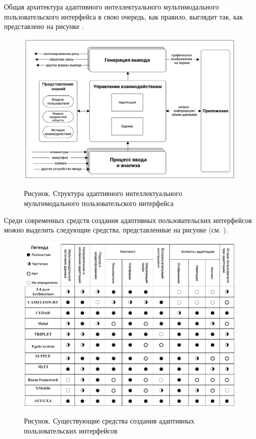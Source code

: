 Общая архитектура адаптивного интеллектуального мультимодального пользовательского интерфейса в свою очередь, как правило, выглядит так, как представлено на рисунке \textit{}.

\begin{figure}[H]
	\caption{Рисунок. Структура адаптивного интеллектуального мультимодального пользовательского интерфейса}
	\includegraphics[scale=0.4]{author/part4/figures/adaptive_ui.png}
	\label{fig:adaptive_ui}
\end{figure}

Среди современных средств создания адаптивных пользовательских интерфейсов можно выделить следующие средства, представленные на рисунке \textit{} (см. ).

\begin{figure}[H]
	\caption{Рисунок. Существующие средства создания адаптивных пользовательских интерфейсов}
	\includegraphics[scale=0.4]{author/part4/figures/adaptive_ui_tools.png}
	\label{fig:adaptive_ui_tools}
\end{figure}

